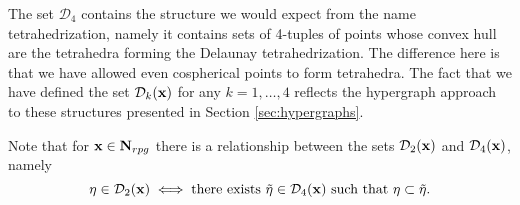 The set $\mathcal D_4$ contains the structure we would expect from the name tetrahedrization, namely it contains sets of 4-tuples of points whose convex hull are the tetrahedra forming the Delaunay tetrahedrization. The difference here is that we have allowed even cospherical points to form tetrahedra. The fact that we have defined the set $\mathcal D_k({\mathbf{x}})$ for any $k=1,\dots,4$ reflects the hypergraph approach to these structures presented in Section \ref{sec:hypergraphs}.

Note that for ${\mathbf{x}}\in\mathbf N_{rpg}$ there is a relationship between the sets $\mathcal D_2({\mathbf{x}})$ and $\mathcal D_4({\mathbf{x}})$, namely
\begin{equation}\label{eq:d2d4}\eta \in \mathcal D_2({\mathbf{x}}) \iff \text{there exists } \tilde\eta \in \mathcal D_4({\mathbf{x}}) \text{ such that } \eta\subset \tilde \eta.\end{equation}



% 


